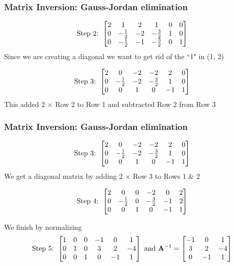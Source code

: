 \documentclass[handout]{beamer}
\numberwithin{equation}{section}
\begin{document}
\begin{frame}
\frametitle{Matrix Inversion: Gauss-Jordan elimination}

$$\hbox{Step 2: }\begin{bmatrix}
2&1&2& 1& 0& 0\\
0&- \frac{1}{2} &-2& -\frac{3}{2} &1 & 0\\
0&- \frac{1}{2} &-1& -\frac{3}{2} & 0&1
\end{bmatrix}$$
Since we are creating a diagonal we want to get rid of the ``1" in (1, 2) \pause

\vspace{.2in}
$$\hbox{Step 3: }\begin{bmatrix}
2&0&-2& -2& 2& 0\\
0&- \frac{1}{2} &-2& - \frac{3}{2} &1 & 0\\
0&0&1& 0& -1&1
\end{bmatrix}$$ \pause
This added 2 $\times$ Row 2 to Row 1 and subtracted Row 2 from Row 3

\end{frame}



\begin{frame}
\frametitle{Matrix Inversion: Gauss-Jordan elimination}

$$\hbox{Step 3: }\begin{bmatrix}
2&0&-2& -2& 2& 0\\
0&- \frac{1}{2}&-2& - \frac{3}{2}&1 & 0\\
0&0&1& 0& -1&1
\end{bmatrix}$$ \pause
We get a diagonal matrix by adding 2 $\times $ Row 3 to Rows 1 \& 2  \pause

$$\hbox{Step 4: }\begin{bmatrix}
2&0&0& -2& 0& 2\\
0&- \frac{1}{2} &0& -\frac{3}{2} &-1 & 2\\
0&0&1& 0& -1&1
\end{bmatrix}$$ \pause

We finish by normalizing
$$\hbox{Step 5: }\begin{bmatrix}
1&0&0& -1& 0& 1\\
0&1&0&3&2 & -4\\
0&0&1& 0& -1&1
\end{bmatrix}
\hbox{ and } \mathbf{A}^{-1}=
\begin{bmatrix}
 -1& 0& 1\\
3&2 & -4\\
 0& -1&1
\end{bmatrix}
$$

\end{frame}
\end{document}
